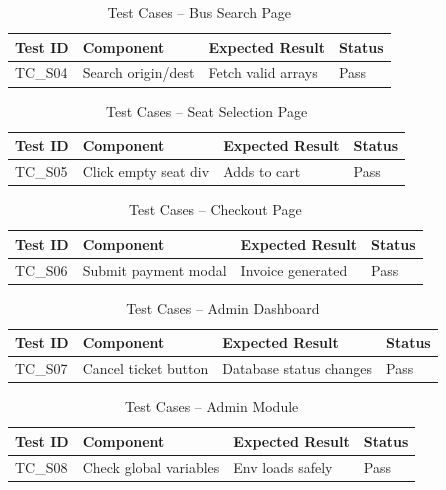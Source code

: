 \begin{table}[H]
\centering
\begin{tabular}{|p{1.5cm}|p{5cm}|p{4cm}|p{4cm}|}
\hline \textbf{Test ID} & \textbf{Component} & \textbf{Expected Result} & \textbf{Status} \\ \hline
TC\_S04 & Search origin/dest & Fetch valid arrays & Pass \\ \hline
\end{tabular}
\caption{Test Cases – Bus Search Page}
\end{table}

\begin{table}[H]
\centering
\begin{tabular}{|p{1.5cm}|p{5cm}|p{4cm}|p{4cm}|}
\hline \textbf{Test ID} & \textbf{Component} & \textbf{Expected Result} & \textbf{Status} \\ \hline
TC\_S05 & Click empty seat div & Adds to cart & Pass \\ \hline
\end{tabular}
\caption{Test Cases – Seat Selection Page}
\end{table}

\begin{table}[H]
\centering
\begin{tabular}{|p{1.5cm}|p{5cm}|p{4cm}|p{4cm}|}
\hline \textbf{Test ID} & \textbf{Component} & \textbf{Expected Result} & \textbf{Status} \\ \hline
TC\_S06 & Submit payment modal & Invoice generated & Pass \\ \hline
\end{tabular}
\caption{Test Cases – Checkout Page}
\end{table}

\begin{table}[H]
\centering
\begin{tabular}{|p{1.5cm}|p{5cm}|p{4cm}|p{4cm}|}
\hline \textbf{Test ID} & \textbf{Component} & \textbf{Expected Result} & \textbf{Status} \\ \hline
TC\_S07 & Cancel ticket button & Database status changes & Pass \\ \hline
\end{tabular}
\caption{Test Cases – Admin Dashboard}
\end{table}

\begin{table}[H]
\centering
\begin{tabular}{|p{1.5cm}|p{5cm}|p{4cm}|p{4cm}|}
\hline \textbf{Test ID} & \textbf{Component} & \textbf{Expected Result} & \textbf{Status} \\ \hline
TC\_S08 & Check global variables & Env loads safely & Pass \\ \hline
\end{tabular}
\caption{Test Cases – Admin Module}
\end{table}
